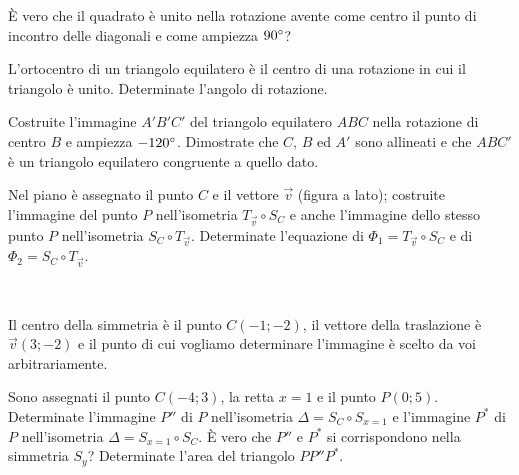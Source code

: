 \begin{esercizio}
\label{ese:8.60} %
\`E vero che il quadrato è unito nella rotazione avente come centro il punto di incontro delle diagonali e come ampiezza $90{}^{\circ}$?
\end{esercizio}

\begin{esercizio}
\label{ese:8.61} %
L'ortocentro di un triangolo equilatero è il centro di una rotazione in cui il triangolo è unito. Determinate l'angolo di rotazione.
\end{esercizio}

\begin{esercizio}
\label{ese:8.62} %
Costruite l'immagine $A'B'C'$ del triangolo equilatero $ABC$ nella rotazione di centro $B$ e ampiezza $-120{}^{\circ}$. Dimostrate che $C$, $B$ ed $A'$ sono allineati e che $ABC'$ è un triangolo equilatero congruente a quello dato.
\end{esercizio}

\noindent\begin{minipage}{0.75\textwidth}\parindent15pt
\begin{esercizio}
\label{ese:8.63} %
Nel piano è assegnato il punto $C$ e il vettore $\vec{v}$ (figura a lato); costruite l'immagine del punto $P$ nell'isometria $T_{\vec{v}} \circ S_{C}$ e anche l'immagine dello stesso punto $P$ nell'isometria $S_{C} \circ T_{\vec{v}}$. Determinate l'equazione di $\Phi_1 = T_{\vec{v}} \circ S_{C}$ e di $\Phi_2 = S_{C} \circ T_{\vec{v}}$.
\end{esercizio}
\end{minipage}\hfil
\begin{minipage}{0.25\textwidth}
	\centering~~
\end{minipage}\vspace{8pt}

\begin{esercizio}
\label{ese:8.64} %
Il centro della simmetria è il punto $C(-1;-2)$, il vettore della traslazione è $\vec{v}(3;-2)$ e il punto di cui vogliamo determinare l'immagine è scelto da voi arbitrariamente. 
\end{esercizio}

\begin{esercizio}
\label{ese:8.65} %
Sono assegnati il punto $C(-4;3)$, la retta $x=1$ e il punto $P(0;5)$. Determinate l'immagine $P''$ di $P$ nell'isometria $\Delta=S_{C}\circ S_{x=1}$ e l'immagine $P^*$ di $P$ nell'isometria $\Delta=S_{x=1}\circ S_{C}$. \`E vero che $P''$ e $P^*$ si corrispondono nella simmetria $S_y$? Determinate l'area del triangolo $PP''P^*$.
\end{esercizio}

